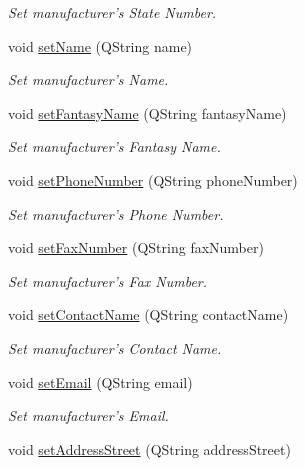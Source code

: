 \begin{DoxyCompactItemize}
\begin{DoxyCompactList}\small\item\em \-Set manufacturer's \-State \-Number. \end{DoxyCompactList}\item 
void \hyperlink{class_manufacturer_ac0cdb250a1758021ceca543773b3ade9}{set\-Name} (\-Q\-String name)
\begin{DoxyCompactList}\small\item\em \-Set manufacturer's \-Name. \end{DoxyCompactList}\item 
void \hyperlink{class_manufacturer_afaae324ad921cad1742bb835e30657ef}{set\-Fantasy\-Name} (\-Q\-String fantasy\-Name)
\begin{DoxyCompactList}\small\item\em \-Set manufacturer's \-Fantasy \-Name. \end{DoxyCompactList}\item 
void \hyperlink{class_manufacturer_ab2398a999bb85815883b7fca6c70240b}{set\-Phone\-Number} (\-Q\-String phone\-Number)
\begin{DoxyCompactList}\small\item\em \-Set manufacturer's \-Phone \-Number. \end{DoxyCompactList}\item 
void \hyperlink{class_manufacturer_a1c85517e2bdb4a521539a2cf6fbff16f}{set\-Fax\-Number} (\-Q\-String fax\-Number)
\begin{DoxyCompactList}\small\item\em \-Set manufacturer's \-Fax \-Number. \end{DoxyCompactList}\item 
void \hyperlink{class_manufacturer_afccef51360a42c223a2a48f2e45a6c14}{set\-Contact\-Name} (\-Q\-String contact\-Name)
\begin{DoxyCompactList}\small\item\em \-Set manufacturer's \-Contact \-Name. \end{DoxyCompactList}\item 
void \hyperlink{class_manufacturer_a01c2cd3400d4b23680554042973f870c}{set\-Email} (\-Q\-String email)
\begin{DoxyCompactList}\small\item\em \-Set manufacturer's \-Email. \end{DoxyCompactList}\item 
void \hyperlink{class_manufacturer_a44fb057f5fa2fae4d35cfa18e2a632bf}{set\-Address\-Street} (\-Q\-String address\-Street)

\end{DoxyCompactItemize}
